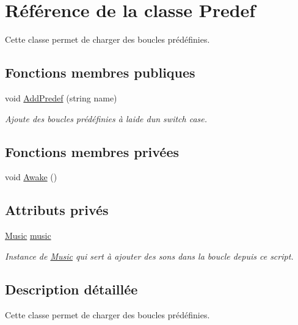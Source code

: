 \hypertarget{class_predef}{}\section{Référence de la classe Predef}
\label{class_predef}


Cette classe permet de charger des boucles prédéfinies.  


\subsection*{Fonctions membres publiques}
\begin{DoxyCompactItemize}
\item 
void \hyperlink{class_predef_a1f04e3cdc11d392a59d41e4329fa4a95}{Add\+Predef} (string name)
\begin{DoxyCompactList}\small\item\em Ajoute des boucles prédéfinies à l\textquotesingle{}aide d\textquotesingle{}un switch case. \end{DoxyCompactList}\end{DoxyCompactItemize}
\subsection*{Fonctions membres privées}
\begin{DoxyCompactItemize}
\item 
void \hyperlink{class_predef_a0600d0688568eec1c6a6548f876dba0c}{Awake} ()
\end{DoxyCompactItemize}
\subsection*{Attributs privés}
\begin{DoxyCompactItemize}
\item 
\hyperlink{class_music}{Music} \hyperlink{class_predef_a073fe301ee41bf7124abc0d155a48c72}{music}
\begin{DoxyCompactList}\small\item\em Instance de \hyperlink{class_music}{Music} qui sert à ajouter des sons dans la boucle depuis ce script. \end{DoxyCompactList}\end{DoxyCompactItemize}


\subsection{Description détaillée}
Cette classe permet de charger des boucles prédéfinies. 




